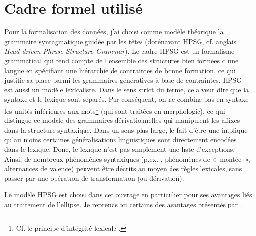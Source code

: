 \section{Cadre formel utilisé}



Pour la formalisation des données, j’ai choisi comme modèle théorique la grammaire syntagmatique guidée par les têtes (dorénavant HPSG, cf. anglais \textit{Head-driven Phrase Structure Grammar}). Le cadre HPSG est un formalisme grammatical qui rend compte de l’ensemble des structures bien formées d’une langue en spécifiant une hiérarchie de contraintes de bonne formation, ce qui justifie sa place parmi les grammaires génératives à base de contraintes. HPSG est aussi un modèle lexicaliste. Dans le sens strict du terme, cela veut dire que la syntaxe et le lexique sont séparés. Par conséquent, on ne combine pas en syntaxe les unités inférieures aux mots\footnote{{}  Cf. le principe d’intégrité lexicale \citep{MillerEtAl1997}.}  (qui sont traitées en morphologie), ce qui distingue ce modèle des grammaires dérivationnelles qui manipulent les affixes dans la structure syntaxique. Dans un sens plus large, le fait d’être une  implique qu’au moins certaines généralisations linguistiques sont directement encodées dans le lexique. Donc, le lexique n’est pas simplement une liste d’exceptions. Ainsi, de nombreux phénomènes syntaxiques (p.ex. , phénomènes de «~montée~», alternances de valence) peuvent être décrits au moyen des règles lexicales, sans passer par une opération de transformation (ou dérivation). 



Le modèle HPSG est choisi dans cet ouvrage en particulier pour ses avantages liés au traitement de l’ellipse. Je reprends ici certains des avantages présentés par \citet{GinzburgEtAlToAppear}.



